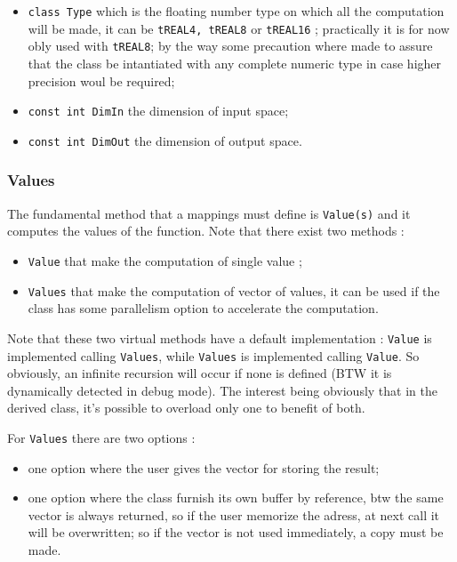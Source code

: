 \begin{itemize}
    \item {\tt class Type} which is the floating number type on which all the computation will be made,
          it can be {\tt tREAL4, tREAL8} or {\tt tREAL16} ;  practically it is for now obly used
          with {\tt tREAL8}; by the way some precaution where made to assure that
          the class be intantiated with any complete numeric type in case higher precision woul be required;


    \item {\tt const int DimIn} the dimension of input space;

    \item {\tt const int DimOut} the dimension of output space.
\end{itemize}

\subsubsection{Values}

The fundamental method that a  mappings must define is  {\tt Value(s)} and it computes the values of 
the function.  Note that there exist two methods :

\begin{itemize}
     \item {\tt Value} that make the computation of single value ;

     \item {\tt Values} that make the computation of vector of values, it can  be used
           if the class has some parallelism option to accelerate the computation.
\end{itemize}

Note that these two virtual methods  have a default implementation : {\tt Value}
is implemented calling {\tt Values},  while {\tt Values} is implemented calling
{\tt Value}.  So obviously, an infinite recursion will occur if none is defined
(BTW it is dynamically detected in debug mode).  The interest being obviously that
in the derived class, it's possible to overload only one to benefit of both.

For {\tt Values} there are two options : 

\begin{itemize}
     \item  one option where the user gives the vector for storing the result;

     \item  one option where the class furnish its own buffer by reference,
            btw the same vector is always returned, so if the user memorize
            the adress, at next call it will be overwritten; so if the vector
            is not used immediately, a copy must be made.
\end{itemize}



